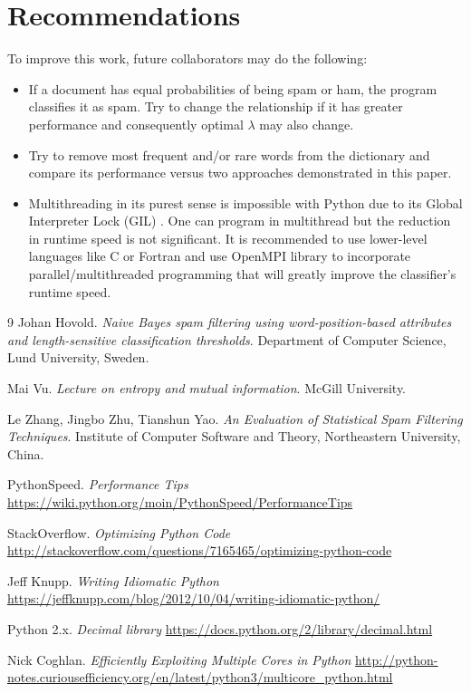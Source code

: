 \documentclass{article}
\begin{document}
\section{Recommendations}
To improve this work, future collaborators may do the following:
\begin{itemize}
	\item If a document has equal probabilities of being spam or ham, the program classifies it as spam. Try to change the relationship if it has greater performance and consequently optimal $\lambda$ may also change.
	\item Try to remove most frequent and/or rare words\cite{bib:mi} from the dictionary and compare its performance versus two approaches demonstrated in this paper.
	\item Multithreading in its purest sense is impossible with Python due to its Global Interpreter Lock (GIL) \cite{bib:gil}. One can program in multithread but the reduction in runtime speed is not significant. It is recommended to use lower-level languages like C or Fortran and use OpenMPI library to incorporate parallel/multithreaded programming that will greatly improve the classifier's runtime speed.
\end{itemize}

\begin{thebibliography}{9}
	Johan Hovold. \emph{Naive Bayes spam filtering using word-position-based attributes and length-sensitive classification thresholds}. Department of Computer Science, Lund University, Sweden.
	
	Mai Vu. \emph{Lecture on entropy and mutual information}. McGill University.
	
	Le Zhang, Jingbo Zhu, Tianshun Yao. \emph{An Evaluation of Statistical Spam Filtering Techniques}. Institute of Computer Software and Theory, Northeastern University, China.
	
	PythonSpeed. \emph{Performance Tips}
	\url{https://wiki.python.org/moin/PythonSpeed/PerformanceTips}
	
	StackOverflow. \emph{Optimizing Python Code}
	\url{http://stackoverflow.com/questions/7165465/optimizing-python-code}
	
	Jeff Knupp. \emph{Writing Idiomatic Python}
	\url{https://jeffknupp.com/blog/2012/10/04/writing-idiomatic-python/}
	
	Python 2.x. \emph{Decimal library}
	\url{https://docs.python.org/2/library/decimal.html}
	
	Nick Coghlan. \emph{Efficiently Exploiting Multiple Cores in Python}
	\url{http://python-notes.curiousefficiency.org/en/latest/python3/multicore_python.html}
\end{thebibliography}
\end{document}
